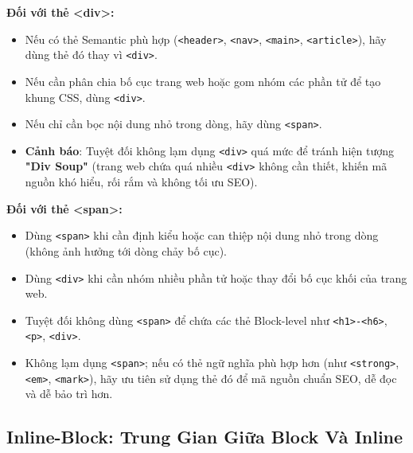 \documentclass[11pt,oneside]{book}
\newcommand{\codeinline}[1]{\textcolor{accentOrange}{\texttt{#1}}}
\newcommand{\term}[1]{\textbf{\textcolor{primaryBlue}{#1}}}
\begin{document}
\begin{conceptBox}
\textbf{Đối với thẻ <div>:}
\begin{itemize}[leftmargin=1.5em, itemsep=2pt, parsep=0pt]
    \item Nếu có thẻ Semantic phù hợp (\codeinline{<header>}, \codeinline{<nav>}, \codeinline{<main>}, \codeinline{<article>}), hãy dùng thẻ đó thay vì \codeinline{<div>}.
    \item Nếu cần phân chia bố cục trang web hoặc gom nhóm các phần tử để tạo khung CSS, dùng \codeinline{<div>}.
    \item Nếu chỉ cần bọc nội dung nhỏ trong dòng, hãy dùng \codeinline{<span>}.
    \item \textbf{Cảnh báo}: Tuyệt đối không lạm dụng \codeinline{<div>} quá mức để tránh hiện tượng \term{"Div Soup"} (trang web chứa quá nhiều \codeinline{<div>} không cần thiết, khiến mã nguồn khó hiểu, rối rắm và không tối ưu SEO).
\end{itemize}

\vspace{4pt}
\textbf{Đối với thẻ <span>:}
\begin{itemize}[leftmargin=1.5em, itemsep=2pt, parsep=0pt]
    \item Dùng \codeinline{<span>} khi cần định kiểu hoặc can thiệp nội dung nhỏ trong dòng (không ảnh hưởng tới dòng chảy bố cục).
    \item Dùng \codeinline{<div>} khi cần nhóm nhiều phần tử hoặc thay đổi bố cục khối của trang web.
    \item Tuyệt đối không dùng \codeinline{<span>} để chứa các thẻ Block-level như \codeinline{<h1>-<h6>}, \codeinline{<p>}, \codeinline{<div>}.
    \item Không lạm dụng \codeinline{<span>}; nếu có thẻ ngữ nghĩa phù hợp hơn (như \codeinline{<strong>}, \codeinline{<em>}, \codeinline{<mark>}), hãy ưu tiên sử dụng thẻ đó để mã nguồn chuẩn SEO, dễ đọc và dễ bảo trì hơn.
\end{itemize}
\end{conceptBox}

\subsection{Inline-Block: Trung Gian Giữa Block Và Inline}
\end{document}
